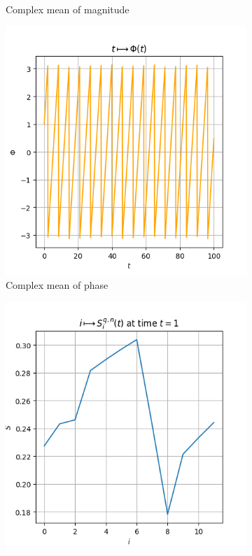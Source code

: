 \documentclass[1pt, a4paper]{article}
\begin{document}
\begin{figure}[htbp]
\begin{subfigure}{0.30\textwidth}
        \caption{Complex mean of magnitude}
        \label{subfig:mag}
    \end{subfigure}
    \hfill
    \begin{subfigure}{0.30\textwidth}
        \centering
        \includegraphics[scale=0.40]{figures/phase_Niiho.png}
        \caption{Complex mean of phase}
        \label{subfig:phase}
    \end{subfigure}
    \hfill
    \begin{subfigure}{0.30\textwidth}
        \centering
        \includegraphics[scale=0.40]{figures/shannon_Niiho.png}

\end{subfigure}
\end{figure}
\end{document}
